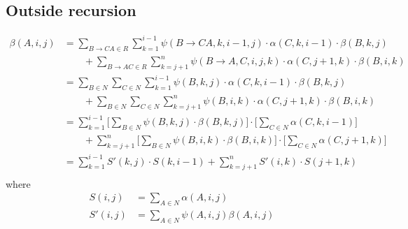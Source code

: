 \subsection{Outside recursion}
\begin{align*}
    \beta(A, i, j) &= \sum_{B \to C A \in R} \sum_{k=1}^{i-1} \psi(B \to C A, k, i-1, j) \cdot \alpha(C, k, i-1) \cdot \beta(B, k, j) \\
            &\qquad + \sum_{B \to A C \in R} \sum_{k=j+1}^{n} \psi(B \to A, C, i, j, k) \cdot \alpha(C, j+1, k) \cdot \beta(B, i, k) \\
        &= \sum_{B \in N} \sum_{C \in N} \sum_{k=1}^{i-1} \psi(B, k, j) \cdot \alpha(C, k, i-1) \cdot \beta(B, k, j) \\
            &\qquad + \sum_{B \in N} \sum_{C \in N} \sum_{k=j+1}^{n} \psi(B, i, k) \cdot \alpha(C, j+1, k) \cdot \beta(B, i, k) \\
        &=  \sum_{k=1}^{i-1}  \Bigg[ \sum_{B \in N} \psi(B, k, j)  \cdot \beta(B, k, j) \Bigg] \cdot \Bigg[ \sum_{C \in N} \alpha(C, k, i-1) \Bigg] \\
            &\qquad + \sum_{k=j+1}^{n}  \Bigg[ \sum_{B \in N}  \psi(B, i, k) \cdot \beta(B, i, k) \Bigg] \cdot  \Bigg[ \sum_{C \in N} \alpha(C, j+1, k) \Bigg] \\
        &=  \sum_{k=1}^{i-1}  S'(k, j) \cdot S(k, i-1) + \sum_{k=j+1}^{n} S'(i, k) \cdot  S(j+1, k) \\
\end{align*}
where
\begin{align*}
    S(i, j) &= \sum_{A \in N} \alpha(A, i, j) \\
    S'(i, j) &= \sum_{A \in N} \psi(A, i, j) \beta(A, i, j)
\end{align*}



